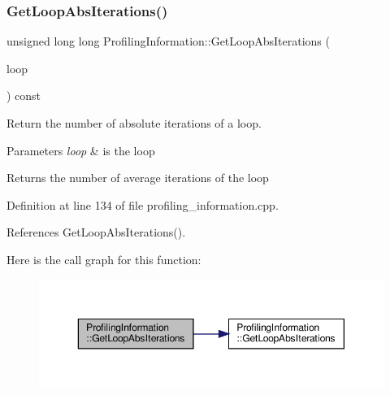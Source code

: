 \subsubsection{\texorpdfstring{Get\+Loop\+Abs\+Iterations()}{GetLoopAbsIterations()}\hspace{0.1cm}{\footnotesize\ttfamily [2/2]}}
{\footnotesize\ttfamily unsigned long long Profiling\+Information\+::\+Get\+Loop\+Abs\+Iterations (\begin{DoxyParamCaption}\item[{const Loop\+Const\+Ref}]{loop }\end{DoxyParamCaption}) const}



Return the number of absolute iterations of a loop. 


\begin{DoxyParams}{Parameters}
{\em loop} & is the loop \\
\hline
\end{DoxyParams}
\begin{DoxyReturn}{Returns}
the number of average iterations of the loop 
\end{DoxyReturn}


Definition at line 134 of file profiling\+\_\+information.\+cpp.



References Get\+Loop\+Abs\+Iterations().

Here is the call graph for this function\+:
\nopagebreak
\begin{figure}[H]
\begin{center}
\leavevmode
\includegraphics[width=350pt]{dd/d5b/classProfilingInformation_af6b4f658ff4e27fc346f68167dba069a_cgraph}
\end{center}
\end{figure}
\mbox{\label{classProfilingInformation_a6c467f30b1822b93d25212619d868377}} 
